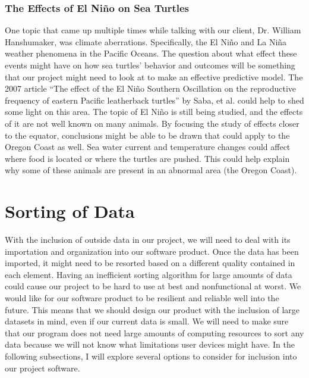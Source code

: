 \documentclass[onecolumn, draftclsnofoot,10pt, compsoc]{IEEEtran}
\begin{document}
\begin{singlespace}
\subsubsection{The Effects of El Ni{\~{n}}o on Sea Turtles}
One topic that came up multiple times while talking with our client, Dr. William
Hanshumaker, was climate aberrations. Specifically, the El Ni{\~{n}}o and La Ni{\~{n}}a weather
phenomena in the Pacific Oceans. The question about what effect these events might
have on how sea turtles' behavior and outcomes will be something that our project might
need to look at to make an effective predictive model. The 2007 article ``The effect of
the El Ni{\~{n}}o Southern Oscillation on the reproductive frequency of eastern Pacific
leatherback turtles'' by Saba, et al. \cite{SabaVincentS2007Teot} could help to shed some light on this area. The topic
of El Ni{\~{n}}o is still being studied, and the effects of it are not well known on many
animals. By focusing the study of effects closer to the equator, conclusions might be
able to be drawn that could apply to the Oregon Coast as well. Sea water current and
temperature changes could affect where food is located or where the turtles are pushed.
This could help explain why some of these animals are present in an abnormal area (the
Oregon Coast).
\section{Sorting of Data}
With the inclusion of outside data in our project, we will need to deal with its importation
and organization into our software product. Once the data has been imported, it might need
to be resorted based on a different quality contained in each element. Having an inefficient
sorting algorithm for large amounts of data could cause our project to be hard to use at best
and nonfunctional at worst. We would like for our software product to be resilient and
reliable well into the future. This means that we should design our product with the inclusion
of large datasets in mind, even if our current data is small. We will need to make sure that
our program does not need large amounts of computing resources to sort any data because we
will not know what limitations user devices might have. In the following subsections, I will
explore several options to consider for inclusion into our project software.


\end{singlespace}
\end{document}
